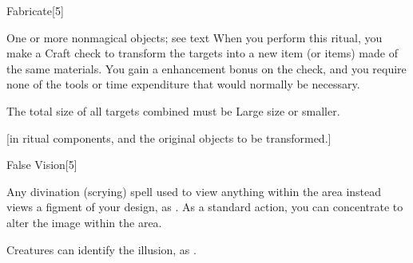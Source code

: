 \begin{spellsection}{Fabricate}[5]
    \begin{spellheader}
    \end{spellheader}
    \begin{spellcontent}
        \begin{spelltargetinginfo}
            \spellrng{\rngclose}
        \end{spelltargetinginfo}
        \begin{spelleffects}

            \begin{spelltargets}{One or more nonmagical objects; see text}
                \spelleffect When you perform this ritual, you make a Craft check to transform the targets into a new item (or items) made of the same materials. You gain a  enhancement bonus on the check, and you require none of the tools or time expenditure that would normally be necessary.

                The total size of all targets combined must be Large size or smaller.
            \end{spelltargets}
        \end{spelleffects}
    \end{spellcontent}
    \begin{spellfooter}
        [in ritual components, and the original objects to be transformed.]
    \end{spellfooter}
\end{spellsection}

\begin{spellsection}{False Vision}[5]
    \begin{spellheader}
    \end{spellheader}
    \begin{spellcontent}
        \begin{spelltargetinginfo}
        \end{spelltargetinginfo}
        \begin{spelleffects}

            \spellline
            \spelleffect Any divination (scrying) spell used to view anything within the area instead views a figment of your design, as . As a standard action, you can concentrate to alter the image within the area.
            \spelldur \durext \dismissable
        \end{spelleffects}
    \end{spellcontent}
    \begin{spellfooter}
        \spellnotes Creatures can identify the illusion, as .
    \end{spellfooter}
\end{spellsection}

